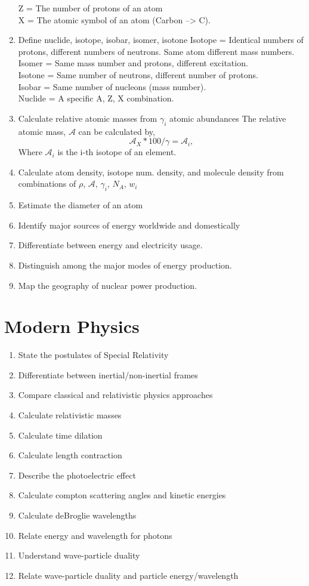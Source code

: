 \documentclass{article}
\begin{document}
\begin{enumerate}
		Z = The number of protons of an atom\\
		X = The atomic symbol of an atom (Carbon --> C).
	\item{Define nuclide, isotope, isobar, isomer, isotone}
		Isotope = Identical numbers of protons, different numbers of neutrons. Same atom different mass numbers.\\
		Isomer = Same mass number and protons, different excitation. \\
		Isotone = Same number of neutrons, different number of protons.\\
		Isobar = Same number of nucleons (mass number). \\
		Nuclide = A specific A, Z, X combination.
	\item{Calculate relative atomic masses from $\gamma_{i}$ atomic abundances}
		The relative atomic mass, $\mathcal{A}$ can be calculated by, 
		\begin{equation}
			\mathcal{A}_X * 100/\gamma = \mathcal{A}_i , 
		\end{equation}
		Where $\mathcal{A}_i$ is the i-th isotope of an element.
	\item{Calculate atom density, isotope num. density, and molecule density from combinations of $\rho$, $\mathcal{A}$, $\gamma_{i}$, $N_{A}$, $w_{i}$}
	\item{Estimate the diameter of an atom}
	\item{Identify major sources of energy worldwide and domestically}
	\item{Differentiate between energy and electricity usage.}
	\item{Distinguish among the major modes of energy production.}
	\item{Map the geography of nuclear power production.}
\end{enumerate}

\section{Modern Physics}
\begin{enumerate}	
	\item{State the postulates of Special Relativity}
	\item{Differentiate between inertial/non-inertial frames}
	\item{Compare classical and relativistic physics approaches}
	\item{Calculate relativistic masses}
	\item{Calculate time dilation}
	\item{Calculate length contraction}
	\item{Describe the photoelectric effect}
	\item{Calculate compton scattering angles and kinetic energies}
	\item{Calculate deBroglie wavelengths}
	\item{Relate energy and wavelength for photons}
	\item{Understand wave-particle duality}
	\item{Relate wave-particle duality and particle energy/wavelength}
\end{enumerate}
\end{document}
